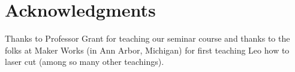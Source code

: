 \section{Acknowledgments}

Thanks to Professor Grant for teaching our seminar course and thanks to the folks at Maker Works (in Ann Arbor, Michigan) for first teaching Leo how to laser cut (among so many other teachings).
